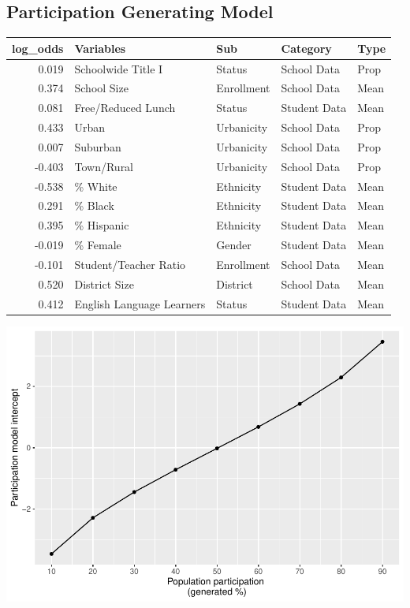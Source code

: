 \documentclass[
  english,
  man,floatsintext]{apa6}
\begin{document}
\hypertarget{participation-generating-model}{%
\subsection{Participation Generating Model}\label{participation-generating-model}}

\begin{table}[H]
\centering
\begin{tabular}{r|l|l|l|l}
\hline
log\_odds & Variables & Sub & Category & Type\\
\hline
0.019 & Schoolwide Title I & Status & School Data & Prop\\
\hline
0.374 & School Size & Enrollment & School Data & Mean\\
\hline
0.081 & Free/Reduced Lunch & Status & Student Data & Mean\\
\hline
0.433 & Urban & Urbanicity & School Data & Prop\\
\hline
0.007 & Suburban & Urbanicity & School Data & Prop\\
\hline
-0.403 & Town/Rural & Urbanicity & School Data & Prop\\
\hline
-0.538 & \% White & Ethnicity & Student Data & Mean\\
\hline
0.291 & \% Black & Ethnicity & Student Data & Mean\\
\hline
0.395 & \% Hispanic & Ethnicity & Student Data & Mean\\
\hline
-0.019 & \% Female & Gender & Student Data & Mean\\
\hline
-0.101 & Student/Teacher Ratio & Enrollment & School Data & Mean\\
\hline
0.520 & District Size & District & School Data & Mean\\
\hline
0.412 & English Language Learners & Status & Student Data & Mean\\
\hline
\end{tabular}
\end{table}

\includegraphics{5---Analysis_files/figure-latex/unnamed-chunk-12-1.pdf}
\end{document}
